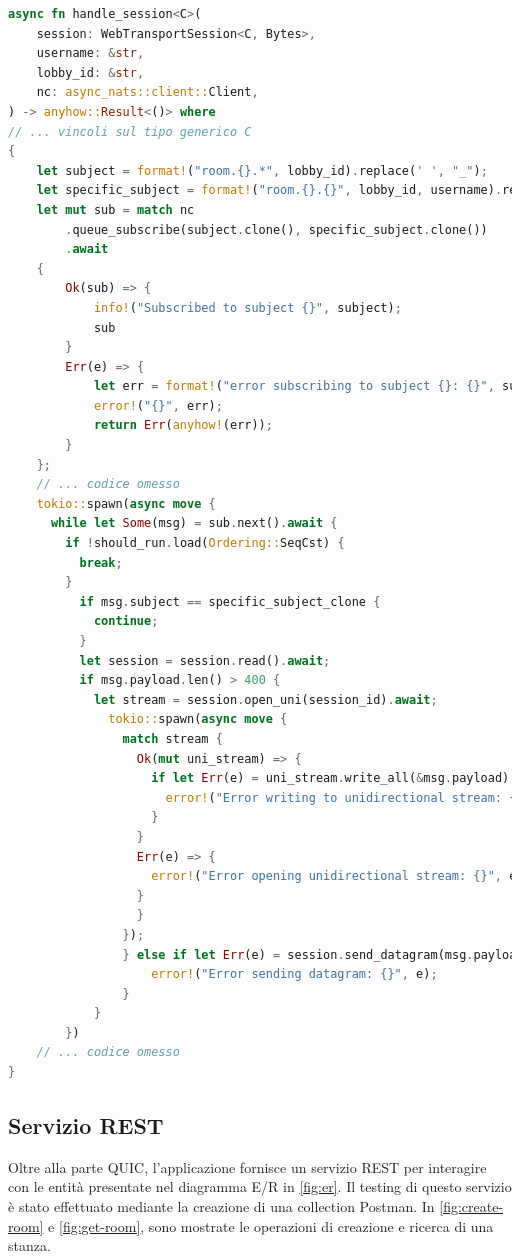 \documentclass{article}
\begin{document}
\begin{lstlisting}[language=Rust, style=boxed, label={lst:nats-sub}, captionpos=b,caption={Broadcast di pacchetti multimediali in una sessione WebTransport}]
async fn handle_session<C>(
    session: WebTransportSession<C, Bytes>,
    username: &str,
    lobby_id: &str,
    nc: async_nats::client::Client,
) -> anyhow::Result<()> where
// ... vincoli sul tipo generico C
{
    let subject = format!("room.{}.*", lobby_id).replace(' ', "_");
    let specific_subject = format!("room.{}.{}", lobby_id, username).replace(' ', "_");
    let mut sub = match nc
        .queue_subscribe(subject.clone(), specific_subject.clone())
        .await
    {
        Ok(sub) => {
            info!("Subscribed to subject {}", subject);
            sub
        }
        Err(e) => {
            let err = format!("error subscribing to subject {}: {}", subject, e);
            error!("{}", err);
            return Err(anyhow!(err));
        }
    };
    // ... codice omesso
    tokio::spawn(async move {
      while let Some(msg) = sub.next().await {
        if !should_run.load(Ordering::SeqCst) {
          break;
        }
          if msg.subject == specific_subject_clone {
            continue;
          }
          let session = session.read().await;
          if msg.payload.len() > 400 {
            let stream = session.open_uni(session_id).await;
              tokio::spawn(async move {
                match stream {
                  Ok(mut uni_stream) => {
                    if let Err(e) = uni_stream.write_all(&msg.payload).await {
                      error!("Error writing to unidirectional stream: {}", e);
                    }
                  }
                  Err(e) => {
                    error!("Error opening unidirectional stream: {}", e);
                  }
                  }
                });
                } else if let Err(e) = session.send_datagram(msg.payload) {
                    error!("Error sending datagram: {}", e);
                }
            }
        })
    // ... codice omesso
} 
\end{lstlisting}

\subsection{Servizio REST}
Oltre alla parte QUIC, l'applicazione fornisce un servizio REST per interagire con le entità 
presentate nel diagramma E/R in \cref{fig:er}. Il 
testing di questo servizio è stato effettuato mediante la creazione di una collection 
Postman. In \cref{fig:create-room} e 
\cref{fig:get-room}, 
sono mostrate le operazioni di creazione e ricerca di una stanza. 
\end{document}

